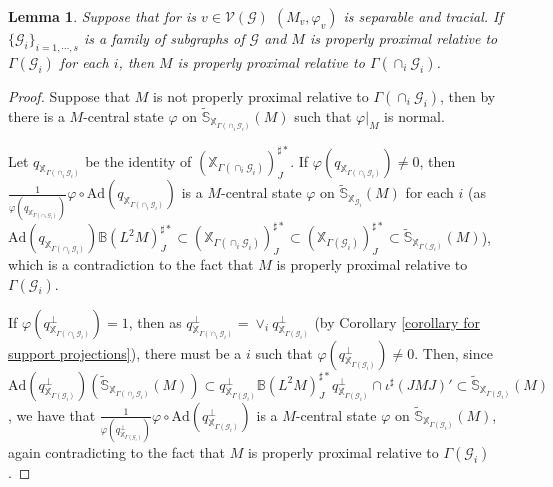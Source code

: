 \documentclass[a4paper, 11pt, reqno]{amsart}
\numberwithin{equation}{section}
\theoremstyle{plain}
\newtheorem{lemma}[thm]{Lemma}
\theoremstyle{remark}
\theoremstyle{definition}
\newcommand{\B}{\mathbb{B}\xspace}
\renewcommand{\S}{\mathbb{S}\xspace}
\newcommand{\XX}{{\mathbb{ X}}}
\newcommand{\VV}{{\mathcal V}}
\newcommand{\GG}{{\mathcal G}}
\begin{document}
\begin{lemma}
    Suppose that for is $v\in \VV(\GG)$ $(M_v,\varphi_v)$ is separable and tracial. If $ \{\GG_i\}_{i=1,\cdots,s} $ is a family of subgraphs of $\GG$ and $ M $ is properly proximal relative to $ \Gamma(\GG_i) $ for each $i$, then $ M $ is properly proximal relative to $ \Gamma(\cap_i \GG_i) $. 
\end{lemma}
\begin{proof}
    Suppose that $ M $ is not properly proximal relative to $ \Gamma(\cap_i \GG_i) $, then by \cite[Lemma 8.5]{DKEP23} there is a $ M $-central state $\varphi$ on $ \tilde{\S}_{\XX_{\Gamma(\cap_i \GG_i)}}(M) $ such that $ \varphi|_M $ is normal.

    Let $q_{  \XX_{\Gamma(\cap_i \GG_i)}} $ be the identity of $ (\XX_{\Gamma(\cap_i \GG_i)})_J^{\sharp*} $. If $ \varphi( q_{  \XX_{\Gamma(\cap_i \GG_i)}} ) \neq 0 $, then $ \frac{1}{\varphi( q_{  \XX_{\Gamma(\cap_i \GG_i)}} )} \varphi\circ \text{Ad}(q_{  \XX_{\Gamma(\cap_i \GG_i)}} ) $ is a $ M $-central state $\varphi$ on $ \tilde{\S}_{\XX_{\GG_i}}(M) $ for each $i$ (as $ \text{Ad}(q_{  \XX_{\Gamma(\cap_i \GG_i)}} )\B(L^2M)^{\sharp*}_J \subset (\XX_{\Gamma(\cap_i \GG_i)})_J^{\sharp*} \subset (\XX_{\Gamma( \GG_i)})_J^{\sharp*} \subset \tilde{\S}_{\XX_{\Gamma(\GG_i)}}(M)$), which is a contradiction to the fact that $ M $ is properly proximal relative to $ \Gamma(\GG_i) $.

    If $\varphi( q_{  \XX_{\Gamma(\cap_i \GG_i)}}^{\perp} ) = 1  $, then as $ q_{  \XX_{\Gamma(\cap_i \GG_i)}}^{\perp} = \vee_{i} q_{  \XX_{\Gamma( \GG_i)}}^{\perp} $ (by Corollary \ref{corollary for support projections}), there must be a $i$ such that $ \varphi( q_{  \XX_{\Gamma( \GG_i)}}^{\perp} ) \neq 0 $. Then, since $ \text{Ad}(q_{  \XX_{\Gamma( \GG_i)}}^{\perp})(\tilde{\S}_{  \XX_{\Gamma(\cap_i \GG_i)}}(M)) \subset q_{  \XX_{\Gamma( \GG_i)}}^{\perp}\B(L^2M)^{\sharp*}_Jq_{  \XX_{\Gamma( \GG_i)}}^{\perp} \cap \iota^{\sharp}(JMJ)'\subset  \tilde{\S}_{  \XX_{\Gamma( \GG_i)}}(M)$, we have that $ \frac{1}{\varphi( q_{  \XX_{\Gamma( \GG_i)}}^{\perp} )} \varphi\circ \text{Ad}(q_{  \XX_{\Gamma( \GG_i)}}^{\perp} ) $ is a $ M $-central state $\varphi$ on $ \tilde{\S}_{\XX_{\Gamma(\GG_i)}}(M) $, again contradicting to the fact that $ M $ is properly proximal relative to $ \Gamma(\GG_i) $.
\end{proof}
\end{document}
